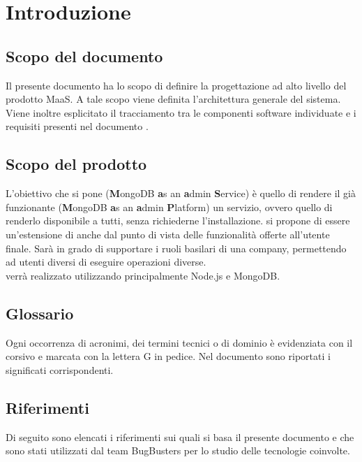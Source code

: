 \section{Introduzione}
\subsection{Scopo del documento}
Il presente documento ha lo scopo di definire la progettazione ad alto livello del prodotto MaaS. A tale scopo viene definita l'architettura generale del sistema. Viene inoltre esplicitato il tracciamento tra le componenti software individuate e i requisiti presenti nel documento \AnalisiDeiRequisiti. 

\subsection{Scopo del prodotto}
L'obiettivo che si pone  (\textbf{M}ongoDB \textbf{a}s an \textbf{a}dmin \textbf{S}ervice) è quello di rendere il già funzionante  (\textbf{M}ongoDB \textbf{a}s an \textbf{a}dmin \textbf{P}latform) un servizio, ovvero quello di renderlo disponibile a tutti, senza richiederne l'installazione.  si propone di essere un'estensione di  anche dal punto di vista delle funzionalità offerte all'utente finale. Sarà in grado di supportare i ruoli basilari di una company, permettendo ad utenti diversi di eseguire operazioni diverse. \\
 verrà realizzato utilizzando principalmente Node.js e MongoDB.

\subsection{Glossario}
Ogni occorrenza di acronimi, dei termini tecnici o di dominio è evidenziata con il corsivo e marcata con la lettera G in pedice. Nel documento \Glossario sono riportati i significati corrispondenti.

\subsection{Riferimenti}
Di seguito sono elencati i riferimenti sui quali si basa il presente documento e che sono stati utilizzati dal team BugBusters per lo studio delle tecnologie coinvolte.

